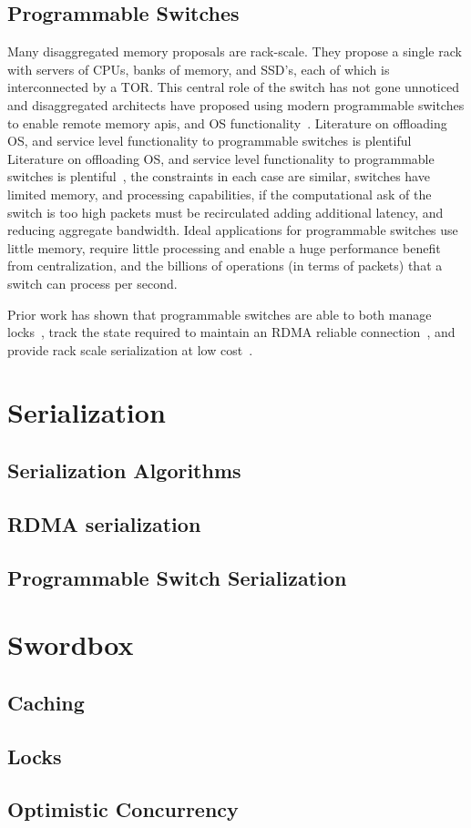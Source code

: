 

\subsection{Programmable Switches}

Many disaggregated memory proposals are rack-scale. They
propose a single rack with servers of CPUs, banks of memory,
and SSD's, each of which is interconnected by a TOR. This
central role of the switch has not gone unnoticed and
disaggregated architects have proposed using modern
programmable switches to enable remote memory apis, and OS
functionality~\cite{disandapp,mind}. Literature on
offloading OS, and service level functionality to
programmable switches is plentiful Literature on offloading
OS, and service level functionality to programmable switches
is plentiful~\cite{netlock,netkv,netchain,netcache}, the
constraints in each case are similar, switches have limited
memory, and processing capabilities, if the computational
ask of the switch is too high packets must be recirculated
adding additional latency, and reducing aggregate bandwidth.
Ideal applications for programmable switches use little
memory, require little processing and enable a huge
performance benefit from centralization, and the billions of
operations (in terms of packets) that a switch can process
per second.

Prior work has shown that programmable switches are able to
both manage locks~\cite{netlock}, track the state required
to maintain an RDMA reliable connection~\cite{tea}, and
provide rack scale serialization at low
cost~\cite{eris,no,when-computer}.


\section{Serialization}

\subsection{Serialization Algorithms}

\subsection{RDMA serialization}

\subsection{Programmable Switch Serialization}

\section{Swordbox}

\subsection{Caching}

\subsection{Locks}

\subsection{Optimistic Concurrency}